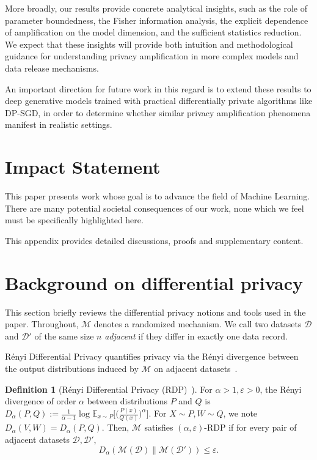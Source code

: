 \documentclass{article}
\theoremstyle{plain}
\theoremstyle{definition}
\newtheorem{definition}[theorem]{Definition}
\theoremstyle{remark}
\begin{document}
More broadly, our results provide concrete analytical insights, such as the role of parameter boundedness, the Fisher information analysis, the explicit dependence of amplification on the model dimension, and the sufficient statistics reduction. We expect that these insights will provide both intuition and methodological guidance for understanding privacy amplification in more complex models and data release mechanisms.

An important direction for future work in this regard is to extend these results to deep generative models trained with practical differentially private algorithms like DP-SGD, in order to determine whether similar privacy amplification phenomena manifest in realistic settings.

\section*{Impact Statement}

This paper presents work whose goal is to advance the field of Machine Learning. There are many potential societal consequences of our work, none which we feel must be specifically highlighted here.





\newpage

\appendix

\onecolumn


This appendix provides detailed discussions, proofs and supplementary content.
\section{Background on differential privacy}
 
\label{app:DP}
This section briefly reviews the differential privacy notions and tools used in the paper. Throughout, $\mathcal{M}$ denotes a randomized mechanism. We call two datasets $\mathcal{D}$ and $\mathcal{D}'$ of the same size $n$ \emph{adjacent} if they differ in exactly one data record.

Rényi Differential Privacy quantifies privacy via the Rényi divergence between the output distributions induced by $\mathcal{M}$ on adjacent datasets~\citep{Mironov2017}.
\begin{definition}[Rényi Differential Privacy (RDP)~\citep{Mironov2017}]
     For $\alpha>1, \varepsilon > 0$, the Rényi divergence of order $\alpha$ between distributions $P$ and $Q$ is $D_\alpha(P,Q) := \frac{1}{\alpha-1}\log\mathbb{E}_{x \sim P}\Big[\big(\frac{P(x)}{Q(x)}\big)^\alpha\Big]$. For $X \sim P, W \sim Q$, we note $D_\alpha(V,W) = D_\alpha(P,Q)$. Then, $\mathcal{M}$ satisfies $(\alpha,\varepsilon)$-RDP if for every pair of adjacent datasets $\mathcal{D},\mathcal{D}'$,
     \[D_\alpha(\mathcal{M}(\mathcal{D}) \| \mathcal{M}(\mathcal{D}')) \leq \varepsilon.\]
\end{definition}
\end{document}
